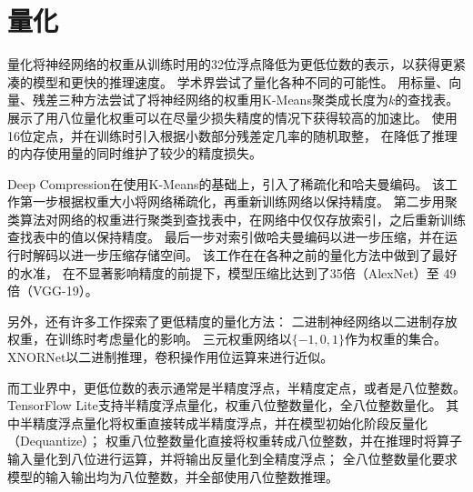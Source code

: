 \section{量化}
量化将神经网络的权重从训练时用的32位浮点降低为更低位数的表示，以获得更紧凑的模型和更快的推理速度。
学术界尝试了量化各种不同的可能性。
\parencite{gong2014compressing}用标量、向量、残差三种方法尝试了将神经网络的权重用K-Means聚类成长度为$k$的查找表。
\parencite{vanhoucke2011improving}展示了用八位量化权重可以在尽量少损失精度的情况下获得较高的加速比。
\parencite{gupta2015deep}使用16位定点，并在训练时引入根据小数部分残差定几率的随机取整，
在降低了推理的内存使用量的同时维护了较少的精度损失。

Deep Compression\cite{han2015deep}在\parencite{gong2014compressing}使用K-Means的基础上，引入了稀疏化和哈夫曼编码。
该工作第一步根据权重大小将网络稀疏化，再重新训练网络以保持精度。
第二步用聚类算法对网络的权重进行聚类到查找表中，在网络中仅仅存放索引，之后重新训练查找表中的值以保持精度。
最后一步对索引做哈夫曼编码以进一步压缩，并在运行时解码以进一步压缩存储空间。
该工作在在各种之前的量化方法中做到了最好的水准，
在不显著影响精度的前提下，模型压缩比达到了35倍（AlexNet）至 49倍（VGG-19）。

另外，还有许多工作探索了更低精度的量化方法：
二进制神经网络\cite{courbariaux2016binarized}以二进制存放权重，在训练时考虑量化的影响。
三元权重网络\cite{li2016ternary}以$\{-1,0,1\}$作为权重的集合。
XNORNet\cite{rastegari2016xnor}以二进制推理，卷积操作用位运算来进行近似。

而工业界中，更低位数的表示通常是半精度浮点，半精度定点，或者是八位整数。
TensorFlow Lite支持半精度浮点量化，权重八位整数量化，全八位整数量化。
其中半精度浮点量化将权重直接转成半精度浮点，并在模型初始化阶段反量化（Dequantize）；
权重八位整数量化直接将权重转成八位整数，并在推理时将算子输入量化到八位进行运算，并将输出反量化到全精度浮点；
全八位整数量化要求模型的输入输出均为八位整数，并全部使用八位整数推理。
